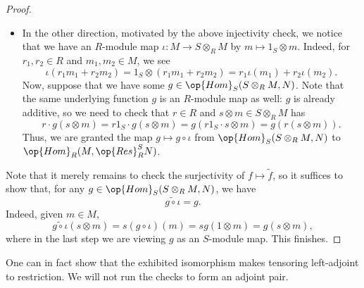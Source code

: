 \begin{proof}
\begin{itemize}
		\item In the other direction, motivated by the above injectivity check, we notice that we have an $R$-module map $\iota:M\to S\otimes_RM$ by $m\mapsto 1_S\otimes m$. Indeed, for $r_1,r_2\in R$ and $m_1,m_2\in M$, we see
		\[\iota(r_1m_1+r_2m_2)=1_S\otimes(r_1m_1+r_2m_2)=r_1\iota(m_1)+r_2\iota(m_2).\]
		Now, suppose that we have some $g\in\op{Hom}_S(S\otimes_RM,N)$. Note that the same underlying function $g$ is an $R$-module map as well: $g$ is already additive, so we need to check that $r\in R$ and $s\otimes m\in S\otimes_RM$ has
		\[r\cdot g(s\otimes m)=r1_S\cdot g(s\otimes m)=g(r1_S\cdot s\otimes m)=g(r(s\otimes m)).\]
		Thus, we are granted the map $g\mapsto g\circ\iota$ from $\op{Hom}_S(S\otimes_RM,N)$ to $\op{Hom}_R(M,\op{Res}_R^SN)$.
	\end{itemize}
	Note that it merely remains to check the surjectivity of $f\mapsto\widetilde f$, so it suffices to show that, for any $g\in\op{Hom}_S(S\otimes_RM,N)$, we have
	\[\widetilde{g\circ\iota}=g.\]
	Indeed, given $m\in M$,
	\[\widetilde{g\circ\iota}(s\otimes m)=s(g\circ\iota)(m)=sg(1\otimes m)=g(s\otimes m),\]
	where in the last step we are viewing $g$ as an $S$-module map. This finishes.
\end{proof}
\begin{remark}
	One can in fact show that the exhibited isomorphism makes tensoring left-adjoint to restriction. We will not run the checks to form an adjoint pair.
\end{remark}

